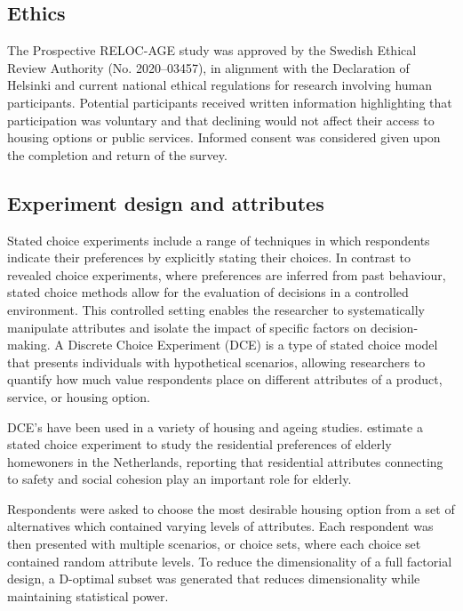 \documentclass[3p,11pt ]{elsarticle}
\begin{document}
\subsection{Ethics}

The Prospective RELOC-AGE study was approved by the Swedish Ethical Review Authority (No. 2020–03457), in alignment with the Declaration of Helsinki and current national ethical regulations for research involving human participants.
Potential participants received written information highlighting that participation was voluntary and that declining would not affect their access to housing options or public services.
Informed consent was considered given upon the completion and return of the survey.



\subsection{Experiment design and attributes}

Stated choice experiments include a range of techniques in which respondents indicate their preferences by explicitly stating their choices.
In contrast to revealed choice experiments, where preferences are inferred from past behaviour, stated choice methods allow for the evaluation of decisions in a controlled environment.
This controlled setting enables the researcher to systematically manipulate attributes and isolate the impact of specific factors on decision-making.
A Discrete Choice Experiment (DCE) is a type of stated choice model that presents individuals with hypothetical scenarios, allowing researchers to quantify how much value respondents place on different attributes of a product, service, or housing option.

DCE's have been used in a variety of housing and ageing studies.
\cite{ossokinaBestLivingConcepts2020} estimate a stated choice experiment to study the residential preferences of elderly homewoners in the Netherlands,
reporting that residential attributes connecting to safety and social cohesion play an important role for elderly.
\cite{ossokinaReferencedependentHousingChoice2022a}


Respondents were asked to choose the most desirable housing option from a set of alternatives which contained varying levels of attributes.
Each respondent was then presented with multiple scenarios, or choice sets,
where each choice set contained random attribute levels.
To reduce the dimensionality of a full factorial design, a D-optimal subset was generated that reduces dimensionality while maintaining statistical power.
\end{document}
